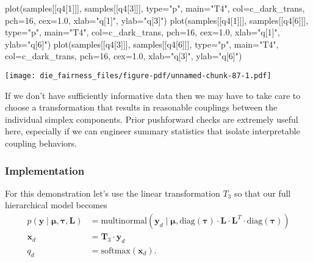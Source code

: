 \documentclass[
  letterpaper,
  DIV=11,
  numbers=noendperiod]{scrartcl}
\newenvironment{Shaded}{\begin{snugshade}}{\end{snugshade}}
\newcommand{\AttributeTok}[1]{\textcolor[rgb]{0.40,0.45,0.13}{#1}}
\newcommand{\DecValTok}[1]{\textcolor[rgb]{0.68,0.00,0.00}{#1}}
\newcommand{\FloatTok}[1]{\textcolor[rgb]{0.68,0.00,0.00}{#1}}
\newcommand{\FunctionTok}[1]{\textcolor[rgb]{0.28,0.35,0.67}{#1}}
\newcommand{\NormalTok}[1]{\textcolor[rgb]{0.00,0.23,0.31}{#1}}
\newcommand{\StringTok}[1]{\textcolor[rgb]{0.13,0.47,0.30}{#1}}
\begin{document}
\begin{Shaded}
\begin{Highlighting}[]
\FunctionTok{plot}\NormalTok{(samples[[}\StringTok{\textquotesingle{}q4[1]\textquotesingle{}}\NormalTok{]], samples[[}\StringTok{\textquotesingle{}q4[3]\textquotesingle{}}\NormalTok{]], }\AttributeTok{type=}\StringTok{"p"}\NormalTok{,}
     \AttributeTok{main=}\StringTok{"T4"}\NormalTok{, }\AttributeTok{col=}\NormalTok{c\_dark\_trans, }\AttributeTok{pch=}\DecValTok{16}\NormalTok{, }\AttributeTok{cex=}\FloatTok{1.0}\NormalTok{,}
     \AttributeTok{xlab=}\StringTok{"q[1]"}\NormalTok{, }\AttributeTok{ylab=}\StringTok{"q[3]"}\NormalTok{)}
\FunctionTok{plot}\NormalTok{(samples[[}\StringTok{\textquotesingle{}q4[1]\textquotesingle{}}\NormalTok{]], samples[[}\StringTok{\textquotesingle{}q4[6]\textquotesingle{}}\NormalTok{]], }\AttributeTok{type=}\StringTok{"p"}\NormalTok{,}
     \AttributeTok{main=}\StringTok{"T4"}\NormalTok{, }\AttributeTok{col=}\NormalTok{c\_dark\_trans, }\AttributeTok{pch=}\DecValTok{16}\NormalTok{, }\AttributeTok{cex=}\FloatTok{1.0}\NormalTok{,}
     \AttributeTok{xlab=}\StringTok{"q[1]"}\NormalTok{, }\AttributeTok{ylab=}\StringTok{"q[6]"}\NormalTok{)}
\FunctionTok{plot}\NormalTok{(samples[[}\StringTok{\textquotesingle{}q4[3]\textquotesingle{}}\NormalTok{]], samples[[}\StringTok{\textquotesingle{}q4[6]\textquotesingle{}}\NormalTok{]], }\AttributeTok{type=}\StringTok{"p"}\NormalTok{,}
     \AttributeTok{main=}\StringTok{"T4"}\NormalTok{, }\AttributeTok{col=}\NormalTok{c\_dark\_trans, }\AttributeTok{pch=}\DecValTok{16}\NormalTok{, }\AttributeTok{cex=}\FloatTok{1.0}\NormalTok{,}
     \AttributeTok{xlab=}\StringTok{"q[3]"}\NormalTok{, }\AttributeTok{ylab=}\StringTok{"q[6]"}\NormalTok{)}
\end{Highlighting}
\end{Shaded}

\texttt{[image: die\_fairness\_files/figure-pdf/unnamed-chunk-87-1.pdf]}

If we don't have sufficiently informative data then we may have to take
care to choose a transformation that results in reasonable couplings
between the individual simplex components. Prior pushforward checks are
extremely useful here, especially if we can engineer summary statistics
that isolate interpretable coupling behaviors.

\subsubsection{Implementation}\label{implementation-3}

For this demonstration let's use the linear transformation \(T_{3}\) so
that our full hierarchical model becomes \begin{align*}
p( \mathbf{y} \mid \boldsymbol{\mu}, \boldsymbol{\tau}, \mathbf{L})
&=
\mathrm{multinormal}( \mathbf{y}_{d} \mid
                      \boldsymbol{\mu},
                      \mathrm{diag}(\boldsymbol{\tau}) \cdot
                      \mathbf{L}
                      \cdot \mathbf{L}^{T} \cdot
                      \mathrm{diag}(\boldsymbol{\tau}) )
\\
\mathbf{x}_{d} &= \mathbf{T}_{3} \cdot \mathbf{y}_{d}
\\
q_{d} &= \mathrm{softmax}(\mathbf{x}_{d}).
\end{align*}
\end{document}

